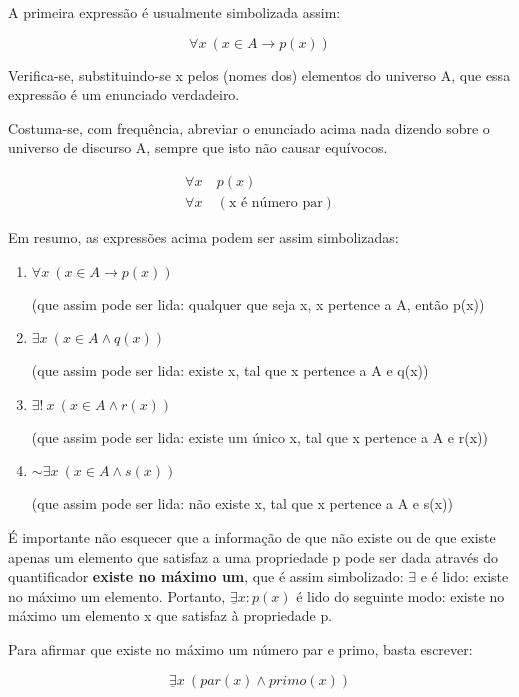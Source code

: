 A primeira expressão é usualmente simbolizada assim:

$$\forall x\ (x \in A \to p(x))$$

Verifica-se, substituindo-se x pelos (nomes dos) elementos do universo A, que essa expressão é um enunciado verdadeiro.

Costuma-se, com frequência, abreviar o enunciado acima nada dizendo sobre o universo de discurso A, sempre que isto não causar equívocos.

\begin{align*}
    \forall x\ & p(x) \\
    \forall x\ & (\text{x é número par})
\end{align*}

Em resumo, as expressões acima podem ser assim simbolizadas:

\begin{enumerate}[label=(\roman*)]
    \item $\forall x\ (x \in A \to p(x))$

    (que assim pode ser lida: qualquer que seja x, x pertence a A,
    então p(x))
    \item $\exists x\ (x \in A \land q(x))$

    (que assim pode ser lida: existe x, tal que x pertence a A e q(x))
    \item $\exists!\ x\ (x \in A \land r(x))$

    (que assim pode ser lida: existe um único x, tal que x pertence a A e r(x))
    \item $\sim \exists x\ (x \in A \land s(x))$

    (que assim pode ser lida: não existe x, tal que x pertence a A e s(x))
\end{enumerate}

É importante não esquecer que a informação de que não existe ou de que existe apenas um elemento que satisfaz a uma propriedade p pode ser dada através do quantificador \textbf{existe no máximo um}, que é assim simbolizado: \underline{$\exists$} e é lido: existe no máximo um elemento.
Portanto, $\underline{\exists} x \colon p(x)$ é lido do seguinte modo: existe no máximo um elemento x que satisfaz à propriedade p.

\begin{exemplo}
    Para afirmar que existe no máximo um número par e primo, basta escrever:

    $$\underline{\exists}x\ (par(x) \land primo(x))$$
\end{exemplo}

